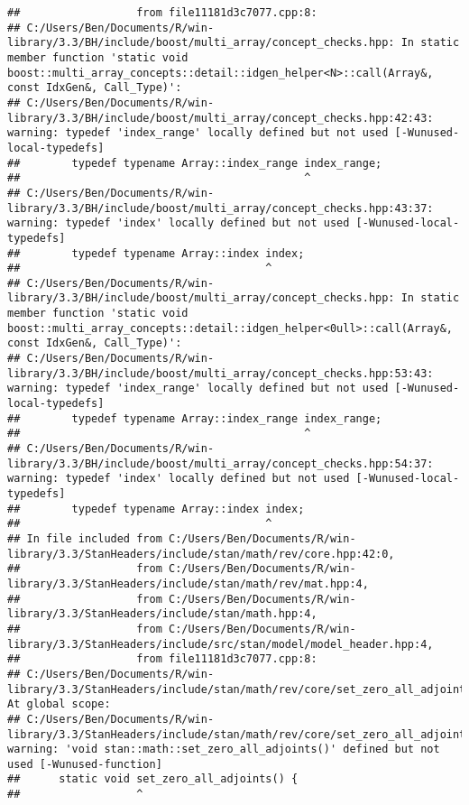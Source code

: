 \documentclass{book}\usepackage[]{graphicx}\usepackage[]{color}
\makeatletter
\newenvironment{kframe}{%
 \def\at@end@of@kframe{}%
 \ifinner\ifhmode%
  \def\at@end@of@kframe{\end{minipage}}%
  \begin{minipage}{\columnwidth}%
 \fi\fi%
 \def\FrameCommand##1{\hskip\@totalleftmargin \hskip-\fboxsep
 \colorbox{shadecolor}{##1}\hskip-\fboxsep
     \hskip-\linewidth \hskip-\@totalleftmargin \hskip\columnwidth}%
 \MakeFramed {\advance\hsize-\width
   \@totalleftmargin\z@ \linewidth\hsize
   \@setminipage}}%
 {\par\unskip\endMakeFramed%
 \at@end@of@kframe}
\newenvironment{knitrout}{}{} %
\makeatother
\begin{document}
\begin{knitrout}
\begin{kframe}
\begin{verbatim}
##                  from file11181d3c7077.cpp:8:
## C:/Users/Ben/Documents/R/win-library/3.3/BH/include/boost/multi_array/concept_checks.hpp: In static member function 'static void boost::multi_array_concepts::detail::idgen_helper<N>::call(Array&, const IdxGen&, Call_Type)':
## C:/Users/Ben/Documents/R/win-library/3.3/BH/include/boost/multi_array/concept_checks.hpp:42:43: warning: typedef 'index_range' locally defined but not used [-Wunused-local-typedefs]
##        typedef typename Array::index_range index_range;
##                                            ^
## C:/Users/Ben/Documents/R/win-library/3.3/BH/include/boost/multi_array/concept_checks.hpp:43:37: warning: typedef 'index' locally defined but not used [-Wunused-local-typedefs]
##        typedef typename Array::index index;
##                                      ^
## C:/Users/Ben/Documents/R/win-library/3.3/BH/include/boost/multi_array/concept_checks.hpp: In static member function 'static void boost::multi_array_concepts::detail::idgen_helper<0ull>::call(Array&, const IdxGen&, Call_Type)':
## C:/Users/Ben/Documents/R/win-library/3.3/BH/include/boost/multi_array/concept_checks.hpp:53:43: warning: typedef 'index_range' locally defined but not used [-Wunused-local-typedefs]
##        typedef typename Array::index_range index_range;
##                                            ^
## C:/Users/Ben/Documents/R/win-library/3.3/BH/include/boost/multi_array/concept_checks.hpp:54:37: warning: typedef 'index' locally defined but not used [-Wunused-local-typedefs]
##        typedef typename Array::index index;
##                                      ^
## In file included from C:/Users/Ben/Documents/R/win-library/3.3/StanHeaders/include/stan/math/rev/core.hpp:42:0,
##                  from C:/Users/Ben/Documents/R/win-library/3.3/StanHeaders/include/stan/math/rev/mat.hpp:4,
##                  from C:/Users/Ben/Documents/R/win-library/3.3/StanHeaders/include/stan/math.hpp:4,
##                  from C:/Users/Ben/Documents/R/win-library/3.3/StanHeaders/include/src/stan/model/model_header.hpp:4,
##                  from file11181d3c7077.cpp:8:
## C:/Users/Ben/Documents/R/win-library/3.3/StanHeaders/include/stan/math/rev/core/set_zero_all_adjoints.hpp: At global scope:
## C:/Users/Ben/Documents/R/win-library/3.3/StanHeaders/include/stan/math/rev/core/set_zero_all_adjoints.hpp:14:17: warning: 'void stan::math::set_zero_all_adjoints()' defined but not used [-Wunused-function]
##      static void set_zero_all_adjoints() {
##                  ^
\end{verbatim}
\begin{alltt}

\end{alltt}
\end{kframe}
\end{knitrout}
\end{document}

